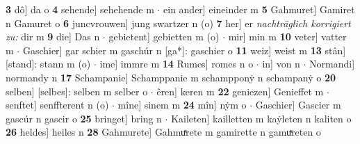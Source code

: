 \documentclass[8pt,a4paper,notitlepage]{article}
\begin{document}
\begin{table}[ht]
\begin{minipage}[t]{0.5\linewidth}
\textbf{3} dô] da o \textbf{4} sehende] sehehende m  $\cdot$ ein ander] eineinder m \textbf{5} Gahmuret] Gamiret n Gamuret o \textbf{6} juncvrouwen] jung swartzer n (o) \textbf{7} her] er \textit{nachträglich korrigiert zu:} dir m \textbf{9} die] Das n  $\cdot$ gebietent] gebietten m (o)  $\cdot$ mir] min m \textbf{10} veter] vatter m  $\cdot$ Gaschier] gar schier m gaschúr n [ga*]: gaschier o \textbf{11} weiz] weist m \textbf{13} stân] [stand]: stann m (o)  $\cdot$ ime] immre m \textbf{14} Rumes] romes n o  $\cdot$ in] von n  $\cdot$ Normandi] normandy n \textbf{17} Schampanie] Schamppanie m schampponẏ n schampanẏ o \textbf{20} selben] [selbes]: selben m selber o  $\cdot$ êren] keren m \textbf{22} geniezen] Genieffet m  $\cdot$ senftet] senffterent n (o)  $\cdot$ mîne] sinem m \textbf{24} mîn] nẏm o  $\cdot$ Gaschier] Gascier m gascúr n gascir o \textbf{25} bringet] bring n  $\cdot$ Kaileten] kailletten m kaẏleten n kaliten o \textbf{26} heldes] heiles n \textbf{28} Gahmurete] Gahmuͯrete m gamirette n gamuͯreten o \newline
\end{minipage}
\end{table}
\newpage
\end{document}
